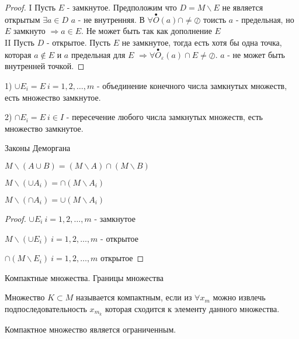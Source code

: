 \begin{proof}
  I Пусть $E$ - замкнутое. Предположим что $D = M \backslash E$ не является
  открытым $\exists a \in D$ $a$ - не внутренняя. В $\forall
  \stackrel{\bullet}{O}(a) \cap \not= \oslash$ тоисть $a$ - предельная, но $E$
  замкнуто $\Rightarrow a \in E$. Не может быть так как дополнение $E$\\

  II Пусть $D$ - открытое. Пусть $E$ не замкнутое, тогда есть хотя бы одна
  точка, которая $a \not\in E$ и $a$ предельная для $E$ $\Rightarrow \forall
  \stackrel{\bullet}{O}_{\varepsilon}(a) \cap E \not= \oslash$. $a$ - не может
  быть внутренней точкой.
\end{proof}

\begin{block}[Свойства]
  1) $\cup E_i = E ~ i = 1,2, \ldots, m$ - объединение конечного числа
  замкнутых множеств, есть множество замкнутое.

  2) $\cap E_i = E ~ i \in I$ - пересечение любого числа замкнутых множеств,
  есть множество замкнутое.

  Законы Деморгана

  $M \backslash (A \cup B) = (M \backslash A) \cap (M \backslash B)$

  $M \backslash (\cup A_i) = \cap (M \backslash A_i)$

  $M \backslash (\cap A_i) = \cup (M \backslash A_i)$

  \begin{proof}
    $\cup E_i ~ i = 1,2, \ldots, m$ - замкнутое

    $M \backslash (\cup E_i) ~ i = 1,2, \ldots, m$ - открытое

    $\cap (M \backslash E_i) ~ i = 1,2, \ldots, m$ открытое
  \end{proof}
\end{block}

\begin{title}[\Large]
  Компактные множества. Границы множества
\end{title}

\begin{define}
  Множество $K \subset M$ называется компактным, если из $\forall x_m$ можно
  извлечь подпоследовательность $x_{m_k}$ которая сходится к элементу данного
  множества.
\end{define}

\begin{theorem}
  Компактное множество является ограниченным.
\end{theorem}

